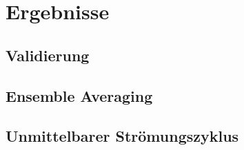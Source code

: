 \chapter{Ergebnisse}
\section{Validierung}
\section{Ensemble Averaging}
\section{Unmittelbarer Strömungszyklus}